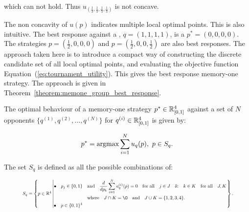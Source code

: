 
which can not hold. Thus \(u_{(\frac{1}{3}, \frac{1}{3}, \frac{1}{3}, \frac{1}{3})}\)
is not concave.

The non concavity of \(u(p)\) indicates multiple local
optimal points. This is also intuitive. The best response against a \Cooperator,
\(q=(1, 1, 1, 1)\), is a \Defector \(p^*=(0, 0, 0, 0)\). The strategies
\(p=(\frac{1}{2}, 0, 0, 0)\) and \(p=(\frac{1}{2}, 0, 0, \frac{1}{2})\) are also
best responses. The approach taken here is to introduce a compact way of
constructing the discrete candidate set of all local optimal points, and evaluating
the objective function Equation~(\ref{eq:tournament_utility}). This gives the best
response memory-one strategy. The approach is given in
Theorem~\ref{theorem:memone_group_best_response}.

\begin{theorem}\label{theorem:memone_group_best_response}

    The optimal behaviour of a memory-one strategy
    \(p^* \in \mathbb{R}_{[0, 1]} ^ 4\)
    against a set of \(N\) opponents \(\{q^{(1)}, q^{(2)}, \dots, q^{(N)} \}\)
    for \(q^{(i)} \in \mathbb{R}_{[0, 1]} ^ 4\) is given by:

    \[p^* = \textnormal{argmax}\sum\limits_{i=1} ^ N  u_q(p), \ p \in S_q.\]

    The set \(S_q\) is defined as all the possible combinations of:

    \begin{equation}\label{eq:s_q_set}
        \resizebox{.9\linewidth}{!}{ $
        S_q =
        \left\{p \in \mathbb{R} ^ 4 \left|
            \begin{aligned}
                \bullet\quad p_j \in \{0, 1\} & \quad \text{and} \quad \frac{d}{dp_k} 
                \sum\limits_{i=1} ^ N  u_q^{(i)}(p) = 0
                \quad \text{for all} \quad j \in J \quad \&  \quad k \in K  \quad \text{for all} \quad J, K \\
                & \quad \text{where} \quad J \cap K = \O \quad
                \text{and} \quad J \cup K = \{1, 2, 3, 4\}.\\
                \bullet\quad  p \in \{0, 1\} ^ 4
            \end{aligned}\right.
        \right\}.
        $}
    \end{equation}
\end{theorem}

